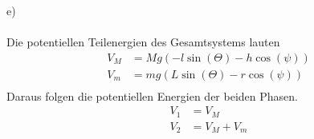 e) \\ \\
Die potentiellen Teilenergien des Gesamtsystems lauten
\begin{align*}
	V_M &= Mg(-l\sin(\varTheta) - h\cos(\psi)) \\
	V_m &= mg(L\sin(\varTheta) - r\cos(\psi)) \\
\end{align*}
Daraus folgen die potentiellen Energien der beiden Phasen.
\begin{align*}
	V_1 &= V_M \\
	V_2 &= V_M + V_m
\end{align*}